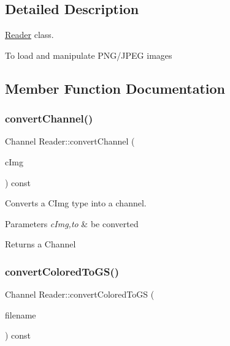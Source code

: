 \subsection{Detailed Description}
\hyperlink{class_reader}{Reader} class. 

To load and manipulate P\+N\+G/\+J\+P\+EG images 

\subsection{Member Function Documentation}
\mbox{\label{class_reader_aaf0f51acf4b34b71e03eb2b11c1b6a16}} 
\subsubsection{\texorpdfstring{convert\+Channel()}{convertChannel()}}
{\footnotesize\ttfamily Channel Reader\+::convert\+Channel (\begin{DoxyParamCaption}\item[{C\+Img$<$ int $>$}]{c\+Img }\end{DoxyParamCaption}) const}



Converts a C\+Img type into a channel. 


\begin{DoxyParams}{Parameters}
{\em c\+Img,to} & be converted \\
\hline
\end{DoxyParams}
\begin{DoxyReturn}{Returns}
a Channel 
\end{DoxyReturn}
\mbox{\label{class_reader_a4cb62495bbc5180292a263655243a30a}} 
\subsubsection{\texorpdfstring{convert\+Colored\+To\+G\+S()}{convertColoredToGS()}}
{\footnotesize\ttfamily Channel Reader\+::convert\+Colored\+To\+GS (\begin{DoxyParamCaption}\item[{std\+::string}]{filename }\end{DoxyParamCaption}) const}



